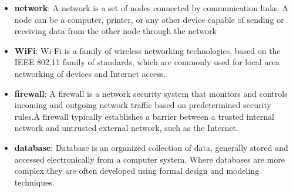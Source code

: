 \begin{appendices}
\begin{itemize}
    \item \textbf{network}: A network is a set of nodes connected by communication links. A node can be a computer, printer, or any other device capable of sending or receiving data from the other node through the network
    
    \item \textbf{WiFi}: Wi-Fi  is a family of wireless networking technologies, based on the IEEE 802.11 family of standards, which are commonly used for local area networking of devices and Internet access.
    
    \item \textbf{firewall}: A firewall is a network security system that monitors and controls incoming and outgoing network traffic based on predetermined security rules.A firewall typically establishes a barrier between a trusted internal network and untrusted external network, such as the Internet.
    
    \item \textbf{database}: Database is an organized collection of data, generally stored and accessed electronically from a computer system. Where databases are more complex they are often developed using formal design and modeling techniques.

\end{itemize}



\end{appendices}


